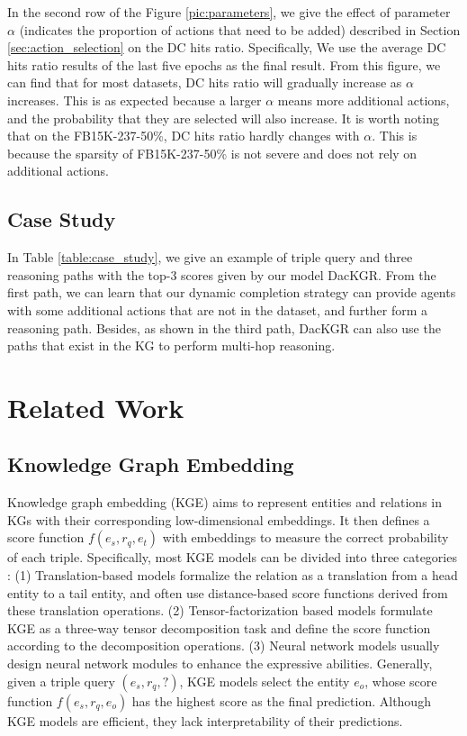 \documentclass[11pt,a4paper]{article}
\begin{document}
In the second row of the Figure \ref{pic:parameters}, we give the effect of parameter $\alpha$ (indicates the proportion of actions that need to be added) described in Section \ref{sec:action_selection} on the DC hits ratio. Specifically, We use the average DC hits ratio results of the last five epochs as the final result. From this figure, we can find that for most datasets, DC hits ratio will gradually increase as $\alpha$ increases. This is as expected because a larger $\alpha$ means more additional actions, and the probability that they are selected will also increase. It is worth noting that on the FB15K-237-50\%, DC hits ratio hardly changes with $\alpha$. This is because the sparsity of FB15K-237-50\% is not severe and does not rely on additional actions.

\subsection{Case Study}

In Table \ref{table:case_study}, we give an example of triple query and three reasoning paths with the top-3 scores given by our model DacKGR. From the first path, we can learn that our dynamic completion strategy can provide agents with some additional actions that are not in the dataset, and further form a reasoning path. Besides, as shown in the third path, DacKGR can also use the paths that exist in the KG to perform multi-hop reasoning.

\section{Related Work}

\subsection{Knowledge Graph Embedding}

Knowledge graph embedding (KGE) aims to represent entities and relations in KGs with their corresponding low-dimensional embeddings. It then defines a score function $f(e_s, r_q, e_t)$ with embeddings to measure the correct probability of each triple. Specifically, most KGE models can be divided into three categories \cite{wang2017knowledge}: (1) Translation-based models \cite{TransE, TransH, TransR, RotatE} formalize the relation as a translation from a head entity to a tail entity, and often use distance-based score functions derived from these translation operations. (2) Tensor-factorization based models \cite{RESCAL, DistMult, TuckER} formulate KGE as a three-way tensor decomposition task and define the score function according to the decomposition operations. (3) Neural network models \cite{NTN, ConvE, ConvKB, R-GCN} usually design neural network modules to enhance the expressive abilities. Generally, given a triple query $(e_s, r_q, ?)$, KGE models select the entity $e_o$, whose score function $f(e_s, r_q, e_o)$ has the highest score as the final prediction. Although KGE models are efficient, they lack interpretability of their predictions.
\end{document}
